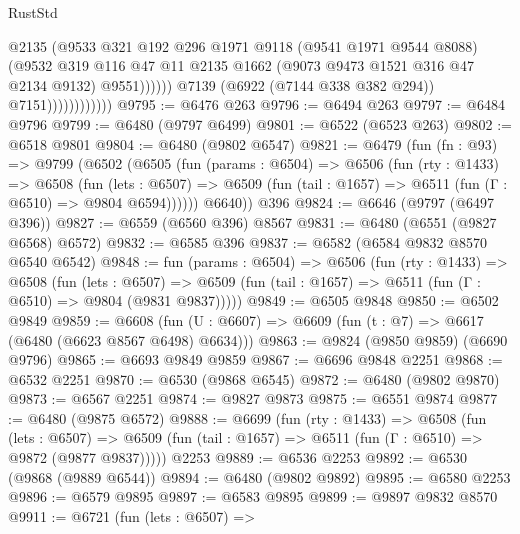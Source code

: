 \begin{lexlean}{RustStd}
\begin{coremodule}
                                    @2135
                                    (@9533
                                      @321
                                      @192
                                      @296
                                      @1971
                                      @9118
                                      (@9541 @1971 @9544 @8088)
                                      (@9532
                                        @319
                                        @116
                                        @47
                                        @11
                                        @2135
                                        @1662
                                        (@9073 @9473 @1521 @316 @47 @2134 @9132)
                                        @9551))))))
                            @7139
                            (@6922 (@7144 @338 @382 @294))
                            @7151))))))))))))
@9795 := @6476 @263
@9796 := @6494 @263
@9797 := @6484 @9796
@9799 := @6480 (@9797 @6499)
@9801 := @6522 (@6523 @263)
@9802 := @6518 @9801
@9804 := @6480 (@9802 @6547)
@9821 := @6479
    (fun (fn : @93) =>
    @9799
      (@6502
        (@6505
          (fun (params : @6504) =>
          @6506
            (fun (rty : @1433) =>
            @6508
              (fun (lets : @6507) =>
              @6509 (fun (tail : @1657) => @6511 (fun (Γ : @6510) => @9804 @6594))))))
        @6640))
    @396
@9824 := @6646 (@9797 (@6497 @396))
@9827 := @6559 (@6560 @396) @8567
@9831 := @6480 (@6551 (@9827 @6568) @6572)
@9832 := @6585 @396
@9837 := @6582 (@6584 @9832 @8570 @6540 @6542)
@9848 := fun (params : @6504) =>
  @6506
    (fun (rty : @1433) =>
    @6508
      (fun (lets : @6507) =>
      @6509 (fun (tail : @1657) => @6511 (fun (Γ : @6510) => @9804 (@9831 @9837)))))
@9849 := @6505 @9848
@9850 := @6502 @9849
@9859 := @6608 (fun (U : @6607) => @6609 (fun (t : @7) => @6617 (@6480 (@6623 @8567 @6498) @6634)))
@9863 := @9824 (@9850 @9859) (@6690 @9796)
@9865 := @6693 @9849 @9859
@9867 := @6696 @9848 @2251
@9868 := @6532 @2251
@9870 := @6530 (@9868 @6545)
@9872 := @6480 (@9802 @9870)
@9873 := @6567 @2251
@9874 := @9827 @9873
@9875 := @6551 @9874
@9877 := @6480 (@9875 @6572)
@9888 := @6699
    (fun (rty : @1433) =>
    @6508
      (fun (lets : @6507) =>
      @6509 (fun (tail : @1657) => @6511 (fun (Γ : @6510) => @9872 (@9877 @9837)))))
    @2253
@9889 := @6536 @2253
@9892 := @6530 (@9868 (@9889 @6544))
@9894 := @6480 (@9802 @9892)
@9895 := @6580 @2253
@9896 := @6579 @9895
@9897 := @6583 @9895
@9899 := @9897 @9832 @8570
@9911 := @6721
    (fun (lets : @6507) =>

\end{coremodule}
\end{lexlean}
